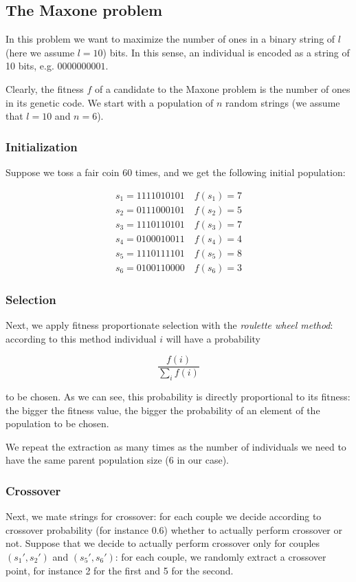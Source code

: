 \subsection{The Maxone problem}
In this problem we want to maximize the number of ones in a binary string of $l$ (here we assume $l = 10$) bits. In this sense, an individual is encoded as a string of 10 bits, e.g. $0000000001$.

Clearly, the fitness $f$ of a candidate to the Maxone problem is the number of ones in its genetic code. We start with a population of $n$ random strings (we assume that $l = 10$ and $n = 6$). 

\subsubsection{Initialization}
Suppose we toss a fair coin 60 times, and we get the following initial population:

\begin{align*}
    s_1 = 1111010101 \quad f(s_1) = 7 \\
s_2 = 0111000101 \quad f(s_2) = 5 \\
s_3 = 1110110101 \quad f(s_3) = 7 \\
s_4 = 0100010011 \quad f(s_4) = 4 \\
s_5 = 1110111101 \quad f(s_5) = 8 \\
s_6 = 0100110000 \quad f(s_6) = 3
\end{align*}

\subsubsection{Selection}
Next, we apply fitness proportionate selection with the \textit{roulette wheel method}: according to this method individual $i$ will have a probability 

$$
\frac{f(i)}{\sum_i f(i)}
$$

to be chosen. As we can see, this probability is directly proportional to its fitness: the bigger the fitness value, the bigger the probability of an element of the population to be chosen.

We repeat the extraction as many times as the number of individuals we need to have the same parent population size (6 in our case).

\subsubsection{Crossover}
Next, we mate strings for crossover: for each couple we decide according to crossover probability (for instance 0.6) whether to actually perform crossover or not. Suppose that we decide to actually perform crossover only for couples $(s_1', s_2')$ and $(s_5', s_6')$: for each couple, we randomly extract a crossover point, for instance 2 for the first and 5 for the second.

